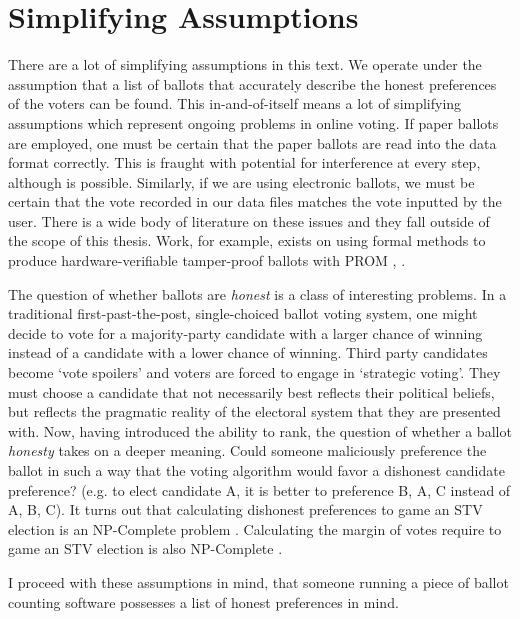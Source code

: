 \section{Simplifying Assumptions}

There are a lot of simplifying assumptions in this text. We operate under the
assumption that a list of ballots that accurately describe the honest
preferences of the voters can be found. This in-and-of-itself means a lot of
simplifying assumptions which represent ongoing problems in online voting. If
paper ballots are employed, one must be certain that the paper ballots are read
into the data format correctly. This is fraught with potential for interference
at every step, although is possible. Similarly, if we are using electronic
ballots, we must be certain that the vote recorded in our data files matches the
vote inputted by the user. There is a wide body of literature on these issues
and they fall outside of the scope of this thesis. Work, for example, exists on
using formal methods to produce hardware-verifiable tamper-proof ballots with
PROM \cite{prom1}, \cite{prom2}. 

The question of whether ballots are \textit{honest} is a class of interesting
problems. In a traditional first-past-the-post, single-choiced ballot voting
system, one might decide to vote for a majority-party candidate with a larger
chance of winning instead of a candidate with a lower chance of winning. Third
party candidates become `vote spoilers' and voters are forced to engage in
`strategic voting'. They must choose a candidate that not necessarily best
reflects their political beliefs, but reflects the pragmatic reality of the
electoral system that they are presented with. Now, having introduced the
ability to rank, the question of whether a ballot \textit{honesty} takes on a
deeper meaning. Could someone maliciously preference the ballot in such a way
that the voting algorithm would favor a dishonest candidate preference? (e.g. to
elect candidate A, it is better to preference B, A, C instead of A, B, C). It
turns out that calculating dishonest preferences to game an STV election is an
NP-Complete problem \cite{strategic}. Calculating the margin of votes require to
game an STV election is also NP-Complete \cite{margin_of_victory}. 

I proceed with these assumptions in mind, that someone running a piece of ballot
counting software possesses a list of honest preferences in mind. 